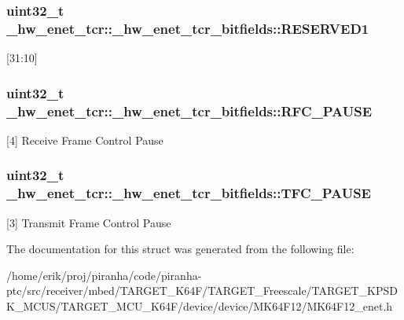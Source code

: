 \subsubsection[{\texorpdfstring{R\+E\+S\+E\+R\+V\+E\+D1}{RESERVED1}}]{\setlength{\rightskip}{0pt plus 5cm}uint32\+\_\+t \+\_\+hw\+\_\+enet\+\_\+tcr\+::\+\_\+hw\+\_\+enet\+\_\+tcr\+\_\+bitfields\+::\+R\+E\+S\+E\+R\+V\+E\+D1}\hypertarget{struct__hw__enet__tcr_1_1__hw__enet__tcr__bitfields_a2d6929686262c5edafbb2949026da39d}{}\label{struct__hw__enet__tcr_1_1__hw__enet__tcr__bitfields_a2d6929686262c5edafbb2949026da39d}
\mbox{[}31\+:10\mbox{]} 
\subsubsection[{\texorpdfstring{R\+F\+C\+\_\+\+P\+A\+U\+SE}{RFC_PAUSE}}]{\setlength{\rightskip}{0pt plus 5cm}uint32\+\_\+t \+\_\+hw\+\_\+enet\+\_\+tcr\+::\+\_\+hw\+\_\+enet\+\_\+tcr\+\_\+bitfields\+::\+R\+F\+C\+\_\+\+P\+A\+U\+SE}\hypertarget{struct__hw__enet__tcr_1_1__hw__enet__tcr__bitfields_a1041fe8182e7450b9179fe243c465f6a}{}\label{struct__hw__enet__tcr_1_1__hw__enet__tcr__bitfields_a1041fe8182e7450b9179fe243c465f6a}
\mbox{[}4\mbox{]} Receive Frame Control Pause 
\subsubsection[{\texorpdfstring{T\+F\+C\+\_\+\+P\+A\+U\+SE}{TFC_PAUSE}}]{\setlength{\rightskip}{0pt plus 5cm}uint32\+\_\+t \+\_\+hw\+\_\+enet\+\_\+tcr\+::\+\_\+hw\+\_\+enet\+\_\+tcr\+\_\+bitfields\+::\+T\+F\+C\+\_\+\+P\+A\+U\+SE}\hypertarget{struct__hw__enet__tcr_1_1__hw__enet__tcr__bitfields_a2cb2f3a8046da6cf9576ac6f4bf289d6}{}\label{struct__hw__enet__tcr_1_1__hw__enet__tcr__bitfields_a2cb2f3a8046da6cf9576ac6f4bf289d6}
\mbox{[}3\mbox{]} Transmit Frame Control Pause 

The documentation for this struct was generated from the following file\+:\begin{DoxyCompactItemize}
\item 
/home/erik/proj/piranha/code/piranha-\/ptc/src/receiver/mbed/\+T\+A\+R\+G\+E\+T\+\_\+\+K64\+F/\+T\+A\+R\+G\+E\+T\+\_\+\+Freescale/\+T\+A\+R\+G\+E\+T\+\_\+\+K\+P\+S\+D\+K\+\_\+\+M\+C\+U\+S/\+T\+A\+R\+G\+E\+T\+\_\+\+M\+C\+U\+\_\+\+K64\+F/device/device/\+M\+K64\+F12/M\+K64\+F12\+\_\+enet.\+h\end{DoxyCompactItemize}
